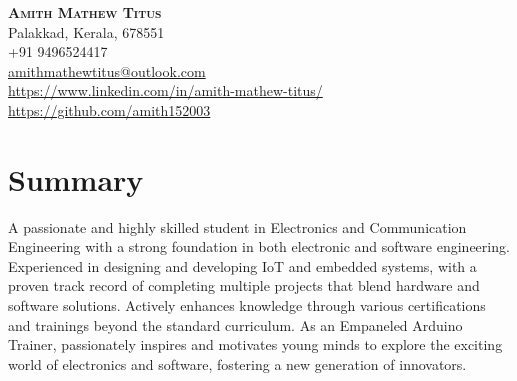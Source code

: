 \documentclass[A4,11pt]{article}
\begin{document}
		
		
		\begin{minipage}[c]{0.2\textwidth}
			\hfill\vline\hfill
		\end{minipage}
		\begin{minipage}[c]{0.6\textwidth}
			\textbf{\Huge \scshape{Amith Mathew Titus}}
			\vspace{10pt} \\
			\small{Palakkad, Kerala, 678551}\\ 
			\small{+91 9496524417} \\
			\href{mailto:amithmathewtitus@outlook.com}{amithmathewtitus@outlook.com}\\
			\href{https://www.linkedin.com/in/amith-mathew-titus/}{https://www.linkedin.com/in/amith-mathew-titus/} \\
			\href{https://github.com/amith152003}{https://github.com/amith152003}
		\end{minipage}
		
		
		\section{Summary}
		\vspace{-5pt}
		\begin{justify}
			\begin{itemize}[leftmargin=0.5cm, label={}]
				{A passionate and highly skilled student in Electronics and Communication Engineering
				with a strong foundation in both electronic and software engineering. Experienced in
				designing and developing IoT and embedded systems, with a proven track record of
				completing multiple projects that blend hardware and software solutions. Actively
				enhances knowledge through various certifications and trainings beyond the
				standard curriculum. As an Empaneled Arduino Trainer, passionately inspires and
				motivates young minds to explore the exciting world of electronics and software,
				fostering a new generation of innovators.}
			\end{itemize}
		\end{justify}
		\vspace{-20pt}
		
\end{document}
